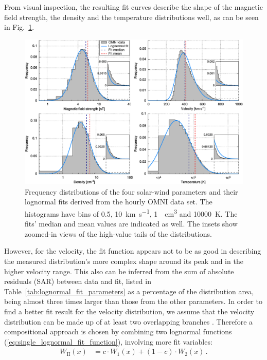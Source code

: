 \documentclass[]{aa}
\begin{document}
        From visual inspection, the resulting fit curves describe the shape of the magnetic field strength, the density and the temperature distributions well, as can be seen in Fig.~\ref{fig:histogram_fits_4_a_zoom_paper_pdfplot}.
        \begin{figure}
                \includegraphics[width=18cm]{histogram_fits_4_a_zoom_paper_pdfplot.pdf}
                \caption{Frequency distributions of the four solar-wind parameters and their lognormal fits derived from the hourly OMNI data set. The histograms have bins of \SI{0.5}{\nT}, \SI{10}{\km\per\s}, \SI{1}{\per\cm\cubed} and \SI{10000}{\K}. The fits' median and mean values are indicated as well. The insets show zoomed-in views of the high-value tails of the distributions.}
                \label{fig:histogram_fits_4_a_zoom_paper_pdfplot}
        \end{figure}
        However, for the velocity, the fit function appears not to be as good in describing the measured distribution’s more complex shape around its peak and in the higher velocity range. This also can be inferred from the sum of absolute residuals (SAR) between data and fit, listed in Table~\ref{tab:lognormal_fit_parameters} as a percentage of the distribution area, being almost three times larger than those from the other parameters.
        In order to find a better fit result for the velocity distribution, we assume that the velocity distribution can be made up of at least two overlapping branches \citep{McGregor2011b}. Therefore a compositional approach  is chosen by combining two lognormal functions (\ref{eq:single_lognormal_fit_function}), involving more fit variables:
        \begin{align}
                W_\text{II}(x) &= c \cdot W_1(x) + (1 -c) \cdot W_2(x)\,.       \label{eq:double_lognormal_fit_function}
        \end{align}
\end{document}
